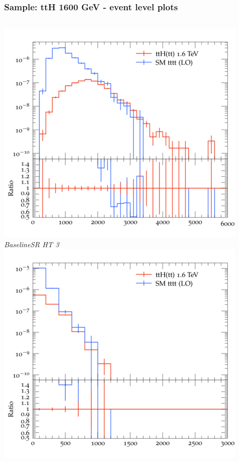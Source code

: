 \documentclass{beamer}
\begin{document}
\begin{frame}
\frametitle{Sample: ttH 1600 GeV - event level plots}
\begin{columns}
\includegraphics[width=\textwidth]{../plots/ttH_1600/tttt_ttH_1LOS/BaselineSR_HT_3.png}\\
\textit{\small BaselineSR HT 3}
\includegraphics[width=\textwidth]{../plots/ttH_1600/tttt_ttH_1LOS/BaselineSR_MET.png}\\

\end{columns}
\end{frame}
\end{document}
